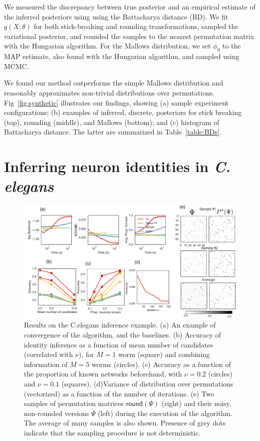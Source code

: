 \documentclass[twoside]{article}
\begin{document}
We measured the discrepancy between true posterior and an empirical
estimate of the inferred posteriors using using the Battacharya
distance (BD). We fit $q(X; \theta)$ for both stick-breaking and
rounding transformations, sampled the variational posterior, and
rounded the samples to the nearest permutation matrix with the
Hungarian algorithm. For the Mallows distribution, we set $\phi_0$ to
the MAP estimate, also found with the Hungarian algorithm, and sampled
using MCMC.
 
We found our method outperforms the simple Mallows distribution and
reasonably approximates non-trivial distributions over
permutations. Fig~\ref{fig:synthetic} illustrates our findings,
showing (a) sample experiment configurations; (b) examples of
inferred, discrete, posteriors for stick breaking (top), rounding
(middle), and Mallows (bottom); and (c) histogram of Battacharya distance.
The latter are summarized in Table~\ref{table:BDs}.


\section{Inferring neuron identities in \textit{C. elegans}}
\label{sec:celegans}

\begin{figure}[ht]
  \centering
  \includegraphics[width=6in]{../figures/figure7.pdf} 
  \caption{Results on the C.elegans inference example. (a) An example of convergence of the algorithm, and the baselines. (b) Accuracy of identity inference as a function of mean number of candidates (correlated with $\nu$), for $M=1$ worm (square) and combining information of $M=5$ worms (circles). (c) Accuracy as a function of the proportion of known networks beforehand,  with $\nu=0.2$ (circles) and $\nu=0.1$ (squares). (d)Variance of distribution over permutations (vectorized) as a function of the number of iterations. (e) Two samples of permutation matrices $\mathsf{round}(\Psi)$ (right) and their noisy, non-rounded versions $\Psi$ (left) during the execution of the algorithm. The average of many samples is also shown. Presence of grey dots indicate that the sampling procedure is not deterministic.}
\label{fig:elegantresults}
\end{figure}
\end{document}
